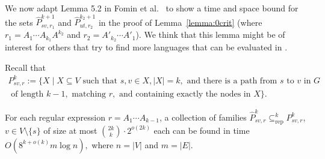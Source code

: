 \documentclass[a4paper,english]{lipics-v2016}
\theoremstyle{plain}
\begin{document}
We now adapt Lemma 5.2 in Fomin et al.~\cite{fomin} to show a time and
space bound for the sets $\hat{P}^{k+1}_{sv,r_1}$ and $\hat{P}^{k_2+1}_{ut,r_2}$ in the proof of
Lemma~\ref{lemma:0crit} (where $r_1=A_1\cdots A_{k_1}A^{k_2}$ and $r_2 = A'_{k_2}\cdots A'_1$). 
  We think
that this lemma might be of interest for others that try to find more
languages that can be evaluated in \fpt.

Recall that 
  \begin{multline*}
    P^{k}_{sv,r} := \{X \mid X\subseteq V \text{ such that } s,v \in X,
|X| = k, \text{ and there is a path from $s$ to $v$ in } G \\
 \text{ of length } k-1, \text{ matching } r,  \text{ and containing exactly the nodes in } X \}.
\end{multline*}
\begin{lemma} \label{lemma:SizeBoundWithRE} For each regular expression
  $r=A_1\cdots A_{k-1}$, a collection of families $\hat{P}^k_{sv,r}
  \subseteq^k_\text{rep} P^k_{sv,r}$, $v \in V\setminus \{s\}$ of size at
  most $\binom{2k}{k} \cdot 2^{o(2k)}$ each can be found in time
  $O\left( 8^{k+o(k)}m \log n \right),$ where $n = |V|$ and $m = |E|$.
\end{lemma}
\end{document}
